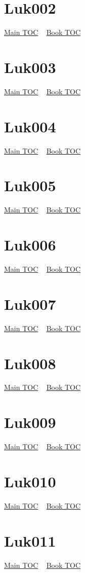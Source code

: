 \documentclass{book}
\begin{document}
  \section{Luk002}\hyperlink{toc}{Main TOC} ~ \hyperref[subsec:Luk]{Book TOC} 
  \section{Luk003}\hyperlink{toc}{Main TOC} ~ \hyperref[subsec:Luk]{Book TOC} 
  \section{Luk004}\hyperlink{toc}{Main TOC} ~ \hyperref[subsec:Luk]{Book TOC} 
  \section{Luk005}\hyperlink{toc}{Main TOC} ~ \hyperref[subsec:Luk]{Book TOC} 
  \section{Luk006}\hyperlink{toc}{Main TOC} ~ \hyperref[subsec:Luk]{Book TOC} 
  \section{Luk007}\hyperlink{toc}{Main TOC} ~ \hyperref[subsec:Luk]{Book TOC} 
  \section{Luk008}\hyperlink{toc}{Main TOC} ~ \hyperref[subsec:Luk]{Book TOC} 
  \section{Luk009}\hyperlink{toc}{Main TOC} ~ \hyperref[subsec:Luk]{Book TOC} 
  \section{Luk010}\hyperlink{toc}{Main TOC} ~ \hyperref[subsec:Luk]{Book TOC} 
  \section{Luk011}\hyperlink{toc}{Main TOC} ~ \hyperref[subsec:Luk]{Book TOC} 
\end{document}
